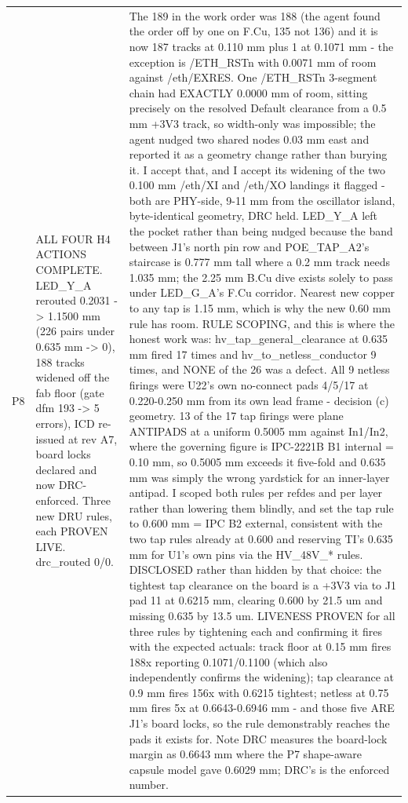 \documentclass[11pt,a4paper]{article}
\begin{document}
{\begin{longtable}{lp{5.2cm}p{7.2cm}}
P8 & ALL FOUR H4 ACTIONS COMPLETE. LED\_Y\_A rerouted 0.2031 -\textgreater{} 1.1500 mm (226 pairs under 0.635 mm -\textgreater{} 0), 188 tracks widened off the fab floor (gate dfm 193 -\textgreater{} 5 errors), ICD re-issued at rev A7, board locks declared and now DRC-enforced. Three new DRU rules, each PROVEN LIVE. drc\_routed 0/0. & The 189 in the work order was 188 (the agent found the order off by one on F.Cu, 135 not 136) and it is now 187 tracks at 0.110 mm plus 1 at 0.1071 mm - the exception is /ETH\_RSTn with 0.0071 mm of room against /eth/EXRES. One /ETH\_RSTn 3-segment chain had EXACTLY 0.0000 mm of room, sitting precisely on the resolved Default clearance from a 0.5 mm +3V3 track, so width-only was impossible; the agent nudged two shared nodes 0.03 mm east and reported it as a geometry change rather than burying it. I accept that, and I accept its widening of the two 0.100 mm /eth/XI and /eth/XO landings it flagged - both are PHY-side, 9-11 mm from the oscillator island, byte-identical geometry, DRC held. LED\_Y\_A left the pocket rather than being nudged because the band between J1's north pin row and POE\_TAP\_A2's staircase is 0.777 mm tall where a 0.2 mm track needs 1.035 mm; the 2.25 mm B.Cu dive exists solely to pass under LED\_G\_A's F.Cu corridor. Nearest new copper to any tap is 1.15 mm, which is why the new 0.60 mm rule has room. RULE SCOPING, and this is where the honest work was: hv\_tap\_general\_clearance at 0.635 mm fired 17 times and hv\_to\_netless\_conductor 9 times, and NONE of the 26 was a defect. All 9 netless firings were U22's own no-connect pads 4/5/17 at 0.220-0.250 mm from its own lead frame - decision (c) geometry. 13 of the 17 tap firings were plane ANTIPADS at a uniform 0.5005 mm against In1/In2, where the governing figure is IPC-2221B B1 internal = 0.10 mm, so 0.5005 mm exceeds it five-fold and 0.635 mm was simply the wrong yardstick for an inner-layer antipad. I scoped both rules per refdes and per layer rather than lowering them blindly, and set the tap rule to 0.600 mm = IPC B2 external, consistent with the two tap rules already at 0.600 and reserving TI's 0.635 mm for U1's own pins via the HV\_48V\_{*} rules. DISCLOSED rather than hidden by that choice: the tightest tap clearance on the board is a +3V3 via to J1 pad 11 at 0.6215 mm, clearing 0.600 by 21.5 um and missing 0.635 by 13.5 um. LIVENESS PROVEN for all three rules by tightening each and confirming it fires with the expected actuals: track floor at 0.15 mm fires 188x reporting 0.1071/0.1100 (which also independently confirms the widening); tap clearance at 0.9 mm fires 156x with 0.6215 tightest; netless at 0.75 mm fires 5x at 0.6643-0.6946 mm - and those five ARE J1's board locks, so the rule demonstrably reaches the pads it exists for. Note DRC measures the board-lock margin as 0.6643 mm where the P7 shape-aware capsule model gave 0.6029 mm; DRC's is the enforced number. \\

\end{longtable}}
\end{document}
